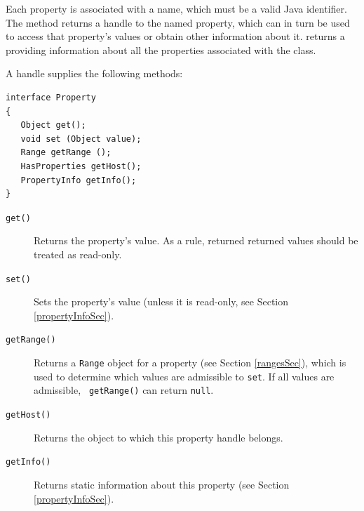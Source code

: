 \documentclass{article}
\begin{document}
Each property is associated with a name, which must be a valid Java
identifier. The  method returns
a  handle to the named property, which can in turn be
used to access that property's values or obtain other information
about it. 
returns a 
providing information about all the properties associated with the
class.

A  handle supplies the following methods:
\begin{lstlisting}[]
interface Property
{
   Object get(); 
   void set (Object value); 
   Range getRange ();
   HasProperties getHost();
   PropertyInfo getInfo();
}
\end{lstlisting}

\begin{description}

\item[{\tt get()} ] \mbox{}

Returns the property's value. As a rule, returned 
returned values should be treated as read-only.

\item[{\tt set()} ] \mbox{}

Sets the property's value (unless it is read-only, see Section
\ref{propertyInfoSec}).

\item[{\tt getRange()} ] \mbox{}

Returns a {\tt Range} object for a property
(see Section \ref{rangesSec}), which is used to determine which values
are admissible to {\tt set}.  If all values are admissible, {\tt
getRange()} can return {\tt null}.

\item[{\tt getHost()} ] \mbox{}

Returns the object to which this property handle belongs.

\item[{\tt getInfo()} ] \mbox{}

Returns static information about this property (see Section
\ref{propertyInfoSec}).

\end{description}
\end{document}
